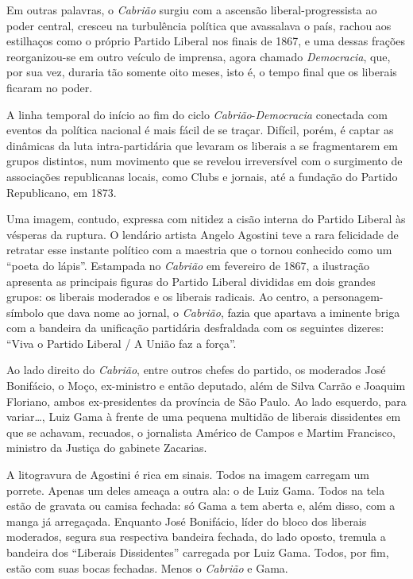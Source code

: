 Em outras palavras, o \emph{Cabrião} surgiu com a ascensão
liberal-progressista ao poder central, cresceu na turbulência política
que avassalava o país, rachou aos estilhaços como o próprio Partido
Liberal nos finais de 1867, e uma dessas frações reorganizou-se em outro
veículo de imprensa, agora chamado \emph{Democracia}, que, por sua vez,
duraria tão somente oito meses, isto é, o tempo final que os liberais
ficaram no poder.

A linha temporal do início ao fim do ciclo
\emph{Cabrião}-\emph{Democracia} conectada com eventos da política
nacional é mais fácil de se traçar. Difícil, porém, é captar as
dinâmicas da luta intra-partidária que levaram os liberais a se
fragmentarem em grupos distintos, num movimento que se revelou
irreversível com o surgimento de associações republicanas locais, como
Clubs e jornais, até a fundação do Partido Republicano, em 1873.

Uma imagem, contudo, expressa com nitidez a cisão interna do Partido
Liberal às vésperas da ruptura. O lendário artista Angelo Agostini teve
a rara felicidade de retratar esse instante político com a maestria que
o tornou conhecido como um ``poeta do lápis''. Estampada no \emph{Cabrião}
em fevereiro de 1867, a ilustração apresenta as principais figuras do
Partido Liberal divididas em dois grandes grupos: os liberais moderados
e os liberais radicais. Ao centro, a personagem-símbolo que dava nome ao
jornal, o \emph{Cabrião}, fazia que apartava a iminente briga com a
bandeira da unificação partidária desfraldada com os seguintes dizeres:
``Viva o Partido Liberal / A União faz a força''.

Ao lado direito do \emph{Cabrião}, entre outros chefes do partido, os
moderados José Bonifácio, o Moço, ex-ministro e então deputado, além de
Silva Carrão e Joaquim Floriano, ambos ex-presidentes da província de
São Paulo. Ao lado esquerdo, para variar\ldots{}, Luiz Gama à frente de uma
pequena multidão de liberais dissidentes em que se achavam, recuados, o
jornalista Américo de Campos e Martim Francisco, ministro da Justiça do
gabinete Zacarias.

A litogravura de Agostini é rica em sinais. Todos na imagem carregam um
porrete. Apenas um deles ameaça a outra ala: o de Luiz Gama. Todos na
tela estão de gravata ou camisa fechada: só Gama a tem aberta e, além
disso, com a manga já arregaçada. Enquanto José Bonifácio, líder do
bloco dos liberais moderados, segura sua respectiva bandeira fechada, do
lado oposto, tremula a bandeira dos ``Liberais Dissidentes'' carregada por
Luiz Gama. Todos, por fim, estão com suas bocas fechadas. Menos o
\emph{Cabrião} e Gama.


